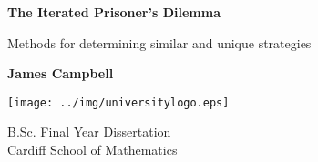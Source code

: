 
\begin{titlepage}
    \begin{center}
        \vspace*{2cm}

        \textbf{The Iterated Prisoner's Dilemma}

        \vspace{0.5cm}
        Methods for determining similar and unique strategies

        \vspace{1.5cm}

        \textbf{James Campbell}
        \vspace{1.5cm}

        \texttt{[image: ../img/universitylogo.eps]}

        \vfill


        B.Sc. Final Year Dissertation\\

        \vspace{0.5cm}
        Cardiff School of Mathematics

        \vspace{1.5cm}



    \end{center}
\end{titlepage}

